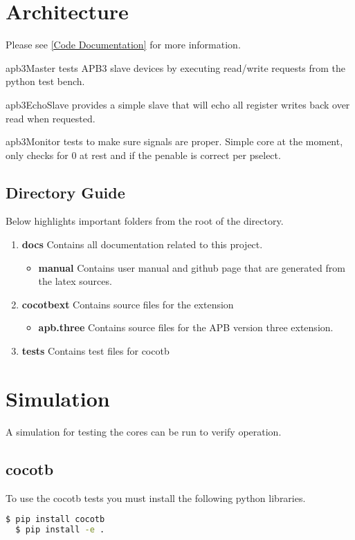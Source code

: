 \section{Architecture}

Please see \ref{Code Documentation} for more information.

\par
apb3Master tests APB3 slave devices by executing read/write requests from the python test bench.
\par
apb3EchoSlave provides a simple slave that will echo all register writes back over read when requested.
\par
apb3Monitor tests to make sure signals are proper. Simple core at the moment, only checks for 0 at rest
and if the penable is correct per pselect.

\subsection{Directory Guide}

\par
Below highlights important folders from the root of the directory.

\begin{enumerate}
  \item \textbf{docs} Contains all documentation related to this project.
    \begin{itemize}
      \item \textbf{manual} Contains user manual and github page that are generated from the latex sources.
    \end{itemize}
  \item \textbf{cocotbext} Contains source files for the extension
    \begin{itemize}
      \item \textbf{apb.three} Contains source files for the APB version three extension.
    \end{itemize}
  \item \textbf{tests} Contains test files for cocotb
\end{enumerate}

\newpage

\section{Simulation}
\par
A simulation for testing the cores can be run to verify operation.

\subsection{cocotb}
\par
To use the cocotb tests you must install the following python libraries.
\begin{lstlisting}[language=bash]
  $ pip install cocotb
  $ pip install -e .
\end{lstlisting}


